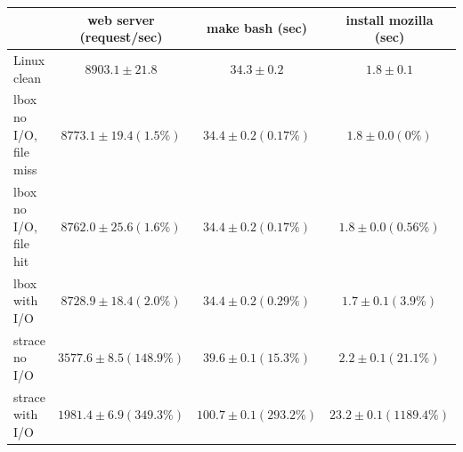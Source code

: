 \begin{table}[ht]
\centering
\begin{tabular}{ | l || c | c | c | }
\hline
 & web server (request/sec) & make bash (sec) & install mozilla (sec) \\
\hline\hline
Linux clean & \begin{math} 8903.1\pm21.8 \end{math} & \begin{math} 34.3\pm0.2 \end{math} & \begin{math} 1.8\pm0.1 \end{math} \\
\hline
lbox no I/O, file miss & \begin{math} 8773.1\pm19.4 (1.5\%) \end{math} & \begin{math} 34.4\pm0.2 (0.17\%) \end{math} & \begin{math} 1.8\pm0.0 (0\%) \end{math} \\
\hline
lbox no I/O, file hit & \begin{math} 8762.0\pm25.6 (1.6\%) \end{math} & \begin{math} 34.4\pm0.2 (0.17\%) \end{math} & \begin{math} 1.8\pm0.0 (0.56\%) \end{math} \\
\hline
lbox with I/O & \begin{math} 8728.9\pm18.4 (2.0\%) \end{math} & \begin{math} 34.4\pm0.2 (0.29\%) \end{math} & \begin{math} 1.7\pm0.1 (3.9\%) \end{math} \\
\hline
strace no I/O & \begin{math} 3577.6\pm8.5 (148.9\%) \end{math} & \begin{math} 39.6\pm0.1 (15.3\%) \end{math} & \begin{math} 2.2\pm0.1 (21.1\%) \end{math} \\
\hline
strace with I/O & \begin{math} 1981.4\pm6.9 (349.3\%) \end{math} & \begin{math} 100.7\pm0.1 (293.2\%) \end{math} & \begin{math} 23.2\pm0.1 (1189.4\%) \end{math} \\

\end{tabular}
\end{table}
